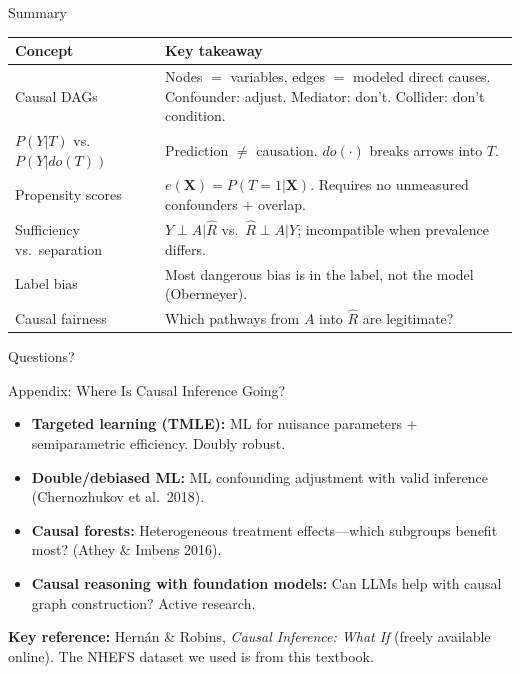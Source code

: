 \documentclass[aspectratio=169,10pt]{beamer}
\begin{document}
\begin{frame}{Summary}
\begin{center}
\renewcommand{\arraystretch}{1.2}
{\footnotesize
\begin{tabular}{lp{7.5cm}}
\toprule
\textbf{Concept} & \textbf{Key takeaway} \\
\midrule
Causal DAGs & Nodes $=$ variables, edges $=$ modeled direct causes. Confounder: adjust. Mediator: don't. Collider: don't condition. \\
$P(Y|T)$ vs.\ $P(Y|do(T))$ & Prediction $\neq$ causation. $do(\cdot)$ breaks arrows into $T$. \\
Propensity scores & $e(\mathbf{X}) = P(T{=}1|\mathbf{X})$. Requires no unmeasured confounders + overlap. \\
Sufficiency vs.\ separation & $Y \perp A | \hat{R}$ vs.\ $\hat{R} \perp A | Y$; incompatible when prevalence differs. \\
Label bias & Most dangerous bias is in the label, not the model (Obermeyer). \\
Causal fairness & Which pathways from $A$ into $\hat{R}$ are legitimate? \\
\bottomrule
\end{tabular}
}
\end{center}
\end{frame}

\begin{frame}[standout]
    Questions?
\end{frame}

\appendix

\begin{frame}{Appendix: Where Is Causal Inference Going?}
\begin{itemize}
    \item \textbf{Targeted learning (TMLE):} ML for nuisance parameters + semiparametric efficiency. Doubly robust.
    \item \textbf{Double/debiased ML:} ML confounding adjustment with valid inference (Chernozhukov et al.\ 2018).
    \item \textbf{Causal forests:} Heterogeneous treatment effects---which subgroups benefit most? (Athey \& Imbens 2016).
    \item \textbf{Causal reasoning with foundation models:} Can LLMs help with causal graph construction? Active research.
\end{itemize}

\vspace{0.3em}
{\small \textbf{Key reference:} Hern\'an \& Robins, \emph{Causal Inference: What If} (freely available online). The NHEFS dataset we used is from this textbook.}
\end{frame}
\end{document}
